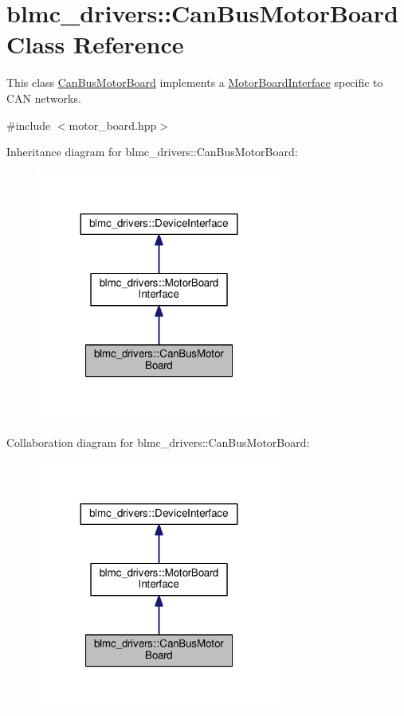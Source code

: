 \hypertarget{classblmc__drivers_1_1CanBusMotorBoard}{}\section{blmc\+\_\+drivers\+:\+:Can\+Bus\+Motor\+Board Class Reference}
\label{classblmc__drivers_1_1CanBusMotorBoard}


This class \hyperlink{classblmc__drivers_1_1CanBusMotorBoard}{Can\+Bus\+Motor\+Board} implements a \hyperlink{classblmc__drivers_1_1MotorBoardInterface}{Motor\+Board\+Interface} specific to C\+AN networks.  




{\ttfamily \#include $<$motor\+\_\+board.\+hpp$>$}



Inheritance diagram for blmc\+\_\+drivers\+:\+:Can\+Bus\+Motor\+Board\+:
\nopagebreak
\begin{figure}[H]
\begin{center}
\leavevmode
\includegraphics[width=227pt]{classblmc__drivers_1_1CanBusMotorBoard__inherit__graph}
\end{center}
\end{figure}


Collaboration diagram for blmc\+\_\+drivers\+:\+:Can\+Bus\+Motor\+Board\+:
\nopagebreak
\begin{figure}[H]
\begin{center}
\leavevmode
\includegraphics[width=227pt]{classblmc__drivers_1_1CanBusMotorBoard__coll__graph}
\end{center}
\end{figure}
